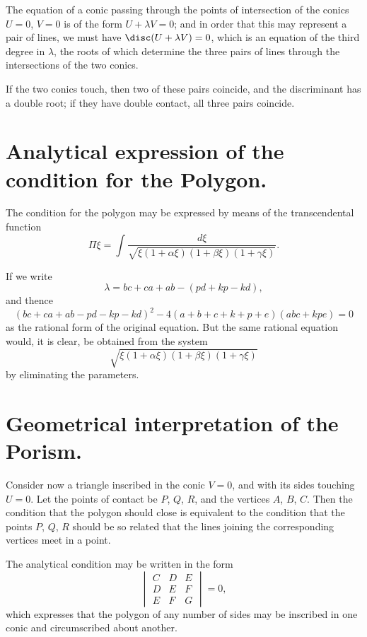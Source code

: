 \documentclass[11pt,a4paper]{book}
\begin{document}
The equation of a conic passing through the points of intersection of the conics $U=0$, $V=0$ is of the form $U+\lambda V=0$; and in order that this may represent a pair of lines, we must have $\disc(U+\lambda V)=0$, which is an equation of the third degree in $\lambda$, the roots of which determine the three pairs of lines through the intersections of the two conics.

If the two conics touch, then two of these pairs coincide, and the discriminant has a double root; if they have double contact, all three pairs coincide.

\newpage
\setcounter{page}{316}

\section*{Analytical expression of the condition for the Polygon.}

The condition for the polygon may be expressed by means of the transcendental function
\[
\Pi\xi = \int \frac{d\xi}{\sqrt{\xi(1+\alpha\xi)(1+\beta\xi)(1+\gamma\xi)}}.
\]

If we write
\[
\lambda = bc+ca+ab-(pd+kp-kd),
\]
and thence
\[
(bc+ca+ab-pd-kp-kd)^2-4(a+b+c+k+p+e)(abc+kpe)=0
\]
as the rational form of the original equation. But the same rational equation would, it is clear, be obtained from the system
\[
\sqrt{\xi(1+\alpha\xi)(1+\beta\xi)(1+\gamma\xi)}
\]
by eliminating the parameters.

\newpage
\setcounter{page}{317}

\section*{Geometrical interpretation of the Porism.}

Consider now a triangle inscribed in the conic $V=0$, and with its sides touching $U=0$. Let the points of contact be $P$, $Q$, $R$, and the vertices $A$, $B$, $C$. Then the condition that the polygon should close is equivalent to the condition that the points $P$, $Q$, $R$ should be so related that the lines joining the corresponding vertices meet in a point.

The analytical condition may be written in the form
\[
\begin{vmatrix}
C & D & E \\
D & E & F \\
E & F & G
\end{vmatrix} = 0,
\]
which expresses that the polygon of any number of sides may be inscribed in one conic and circumscribed about another.
\end{document}
